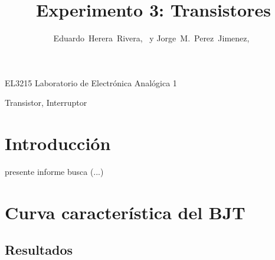 \documentclass[journal]{IEEEtran}
\begin{document}
%
\title{Experimento 3: Transistores}


\author{Eduardo~Herera~Rivera,~
        y Jorge~M.~Perez~Jimenez,~
}


%
{EL3215 Laboratorio de Electrónica Analógica 1}


\maketitle


\begin{abstract}

\end{abstract}

\begin{IEEEkeywords}
Transistor, Interruptor
\end{IEEEkeywords}


\section{Introducción}

 presente informe busca	(...)



\section{Curva característica del BJT}
\subsection{Resultados}
\end{document}
